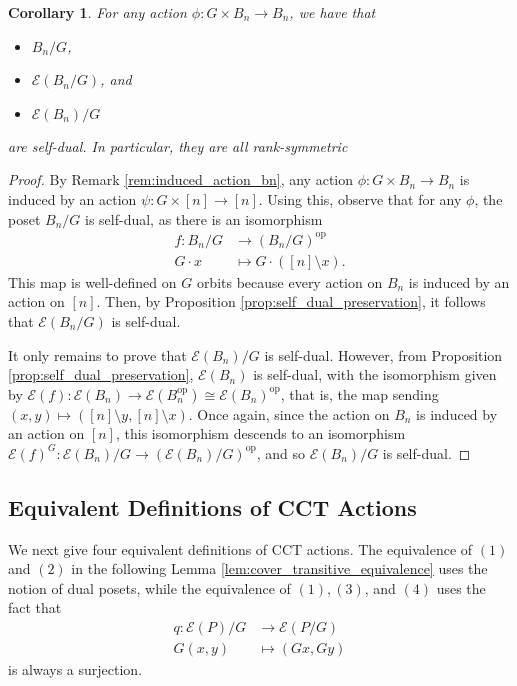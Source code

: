 \documentclass[smallextended, envcountsame, numbook]{svjour3}
\theoremstyle{plain}
\newtheorem{cor}[thm]{Corollary}
\theoremstyle{definition}
\theoremstyle{remark}
\numberwithin{equation}{section}
\newcommand\ssec{\subsection}
\newcommand\op{\operatorname{op}}
\begin{document}
\begin{cor}
\label{cor:duality_bn_quotients}
For any action $\phi\colon G \times B_n \rightarrow B_n$, we have that
\begin{itemize}
	\item $B_n/G$,
	\item $\mathcal E(B_n/G)$, and
	\item $\mathcal E(B_n)/G$
\end{itemize} are self-dual. In particular, they are all rank-symmetric 
\end{cor}
\begin{proof}
By Remark \ref{rem:induced_action_bn}, any action $\phi\colon G\times B_n \rightarrow B_n$ is induced by an action $\psi\colon G \times [n] \rightarrow [n]$. Using this, observe that for any $\phi$, the poset $B_n/G$ is self-dual, as there is an isomorphism 
\begin{align*}
	f\colon B_n/G &\rightarrow (B_n/G)^{\op} \\
	G \cdot x &\mapsto G \cdot ([n] \setminus x).
\end{align*}
This map is well-defined on $G$ orbits because every action on $B_n$ is induced by an action on $[n]$. Then, by Proposition \ref{prop:self_dual_preservation}, it follows that $\mathcal E(B_n/G)$ is self-dual.

It only remains to prove that $\mathcal E(B_n)/G$ is self-dual. However, from Proposition \ref{prop:self_dual_preservation}, $\mathcal E(B_n)$ is self-dual, with the isomorphism given by $\mathcal E(f)\colon\mathcal E(B_n) \rightarrow \mathcal E(B_n^{\op})\cong \mathcal E(B_n)^{\op}$, that is, the map sending $(x,y) \mapsto ([n]\setminus y,[n] \setminus x)$. Once again, since the action on $B_n$ is induced by an action on $[n]$, this isomorphism descends to an isomorphism $\mathcal E(f)^G\colon\mathcal E(B_n)/G \rightarrow  (\mathcal{E}(B_n)/G)^{\op}$, and so $\mathcal E(B_n)/G$ is self-dual.
\end{proof}

\ssec{Equivalent Definitions of CCT Actions}
\label{ssec:equivalent_defs}

We next give four equivalent definitions of CCT actions. The equivalence of $(1)$ and $(2)$ in the following Lemma \ref{lem:cover_transitive_equivalence} uses the notion of dual posets, while the equivalence of $(1),(3)$, and $(4)$ uses the fact that 
\begin{align*}
q\colon\mathcal E(P)/G &\rightarrow \mathcal E(P/G)\\
G(x,y) &\mapsto (Gx,Gy)
\end{align*}
 is always a surjection.
\end{document}
